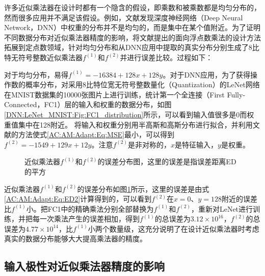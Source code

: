 许多近似乘法器在设计时都有一个隐含的假设，即乘数和被乘数都是均匀分布的，然而很多应用并不满足该假设。例如，文献\cite{DNN:WeightAnalysis2}发现深度神经网络（Deep Neural Network，DNN）中权重的分布并不是均匀的，而是集中在某个值附近。为了证明不同数据分布对近似乘法器精度的影响，将文献\cite{AC:AM:OU}提出的面向浮点数乘法的设计方法拓展到定点数领域，针对均匀分布和从DNN应用中提取的真实分布分别生成了8比特无符号整数近似乘法器$f^{(1)}$和$f^{(2)}$并进行误差比较。过程如下：

对于均匀分布，易得$f^{(1)} = -16384 + 128 x + 128 y$。对于DNN应用，为了获得操作数的概率分布，对采用8比特位宽无符号整数量化（Quantization）的LeNet网络在MNIST数据集的10000张图片上进行训练\cite{DNN:LeNet_MNIST}，统计第一个全连接（First Fully-Connected，FC1）层的输入和权重的数据分布，如图\ref{DNN:LeNet_MNIST:Fig:FC1_distribution}所示，可以看到输入值很多是0而权重值集中在128附近。
将输入和权重分别用半高斯和高斯分布进行拟合，并利用文献\cite{AC:AM:OU}的方法使式\eqref{AC:AM:Adapt:Eq:MSE}最小，可以得到$f^{(2)} = -1549 + 129 x + 12 y$。注意$f^{(2)}$是非对称的，$x$是特征输入，$y$是权重。

\begin{figure}[!htb]
    \centering
    \centering
    \caption{近似乘法器$f^{(1)}$和$f^{(2)}$的误差分布图，这里的误差是指误差距离ED的平方}
\label{AC:AM:Adapt:Fig:f1_f2_ED2_dists}
\end{figure}

近似乘法器$f^{(1)}$和$f^{(2)}$的误差分布如图\ref{AC:AM:Adapt:Fig:f1_f2_ED2_dists}所示，这里的误差是由式\eqref{AC:AM:Adapt:Eq:ED2}计算得到的，可以看到$f^{(2)}$在$x=0$、$y=128$附近的误差比$f^{(1)}$小。把FC1中的精确乘法分别全部替换为$f^{(1)}$和$f^{(2)}$，重新对LeNet进行训练，并把每一次乘法产生的误差相加，得到$f^{(1)}$的总误差为$3.12 \times 10^{16}$，$f^{(2)}$的总误差为$4.77 \times 10^{14}$，比$f^{(1)}$小两个数量级，这充分说明了在设计近似乘法器时考虑真实的数据分布能够大大提高乘法器的精度。

\subsection{输入极性对近似乘法器精度的影响}

